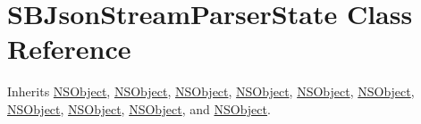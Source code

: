\hypertarget{interface_s_b_json_stream_parser_state}{
\section{\-S\-B\-Json\-Stream\-Parser\-State \-Class \-Reference}
\label{interface_s_b_json_stream_parser_state}
}


\-Inherits \hyperlink{class_n_s_object}{\-N\-S\-Object}, \hyperlink{class_n_s_object}{\-N\-S\-Object}, \hyperlink{class_n_s_object}{\-N\-S\-Object}, \hyperlink{class_n_s_object}{\-N\-S\-Object}, \hyperlink{class_n_s_object}{\-N\-S\-Object}, \hyperlink{class_n_s_object}{\-N\-S\-Object}, \hyperlink{class_n_s_object}{\-N\-S\-Object}, \hyperlink{class_n_s_object}{\-N\-S\-Object}, \hyperlink{class_n_s_object}{\-N\-S\-Object}, and \hyperlink{class_n_s_object}{\-N\-S\-Object}.



